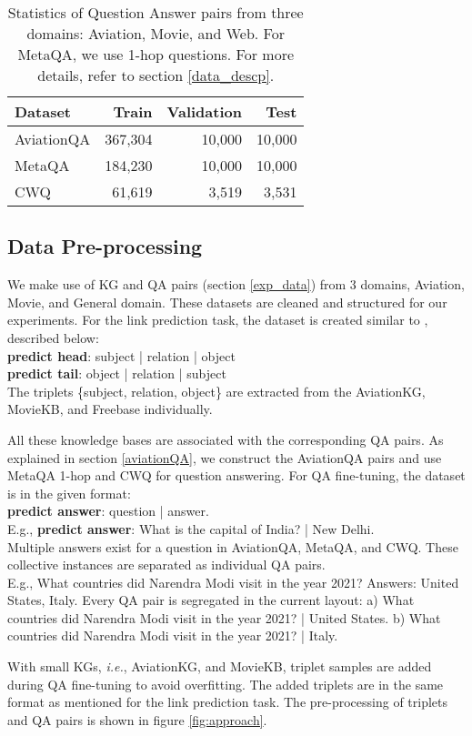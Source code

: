 \documentclass[11pt]{article}
\begin{document}
\begin{table}[!h]
  \begin{center}
    \begin{tabular}{lrrr} 
    \hline
      \textbf{Dataset} & \textbf{Train} & \textbf{Validation} & \textbf{Test}\\
      \hline
      AviationQA & 367,304 & 10,000 & 10,000\\
      MetaQA  & 184,230 & 10,000 & 10,000\\
      CWQ & 61,619 & 3,519 & 3,531\\
      \hline
    \end{tabular}
        \caption{Statistics of Question Answer pairs from three domains: Aviation, Movie, and Web. For MetaQA, we use 1-hop questions. For more details, refer to section \ref{data_descp}. }
    \label{tab:QA_stats}
  \end{center}
\end{table}


\subsection{Data Pre-processing}\label{data pre-process}

We make use of KG and QA pairs (section \ref{exp_data}) from 3 domains, Aviation, Movie, and General domain. These datasets are cleaned and structured for our experiments. For the link prediction task, the dataset is created similar to \citet{saxena2022sequence}, described below:
\\
\textbf{predict head}: subject | relation | object
\\
\textbf{predict tail}: object | relation | subject
\\
The triplets \{subject, relation, object\} are extracted from the AviationKG, MovieKB, and Freebase individually. 
\par
All these knowledge bases are associated with the corresponding QA pairs. As explained in section \ref{aviationQA}, we construct the AviationQA pairs and use MetaQA 1-hop and CWQ for question answering. For QA fine-tuning, the dataset is in the given format:\\ \textbf{predict answer}: question |  answer. \\
E.g., \textbf{predict answer}: What is the capital of India? |  New Delhi.  
\\
Multiple answers exist for a question in AviationQA, MetaQA, and CWQ. These collective instances are separated as individual QA pairs. \\
E.g., What countries did Narendra Modi visit in the year 2021? Answers: United States, Italy. Every QA pair is segregated in the current layout: a) What countries did Narendra Modi visit in the year 2021? |  United States. b) What countries did Narendra Modi visit in the year 2021? |  Italy.
\par
With small KGs, \textit{i.e.}, AviationKG, and MovieKB, triplet samples are added during QA fine-tuning to avoid overfitting. The added triplets are in the same format as mentioned for the link prediction task.
The pre-processing of triplets and QA pairs is shown in figure \ref{fig:approach}.
\end{document}

